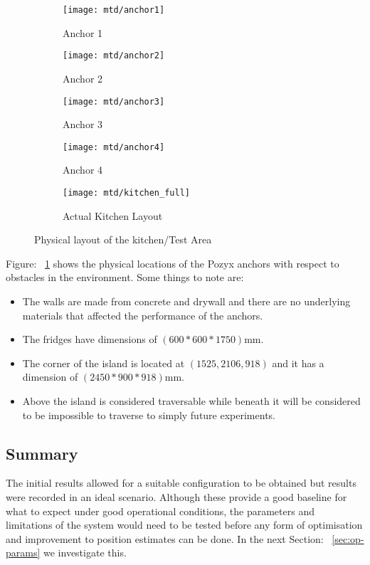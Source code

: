 \begin{figure}[h!]
    \centering
    \begin{subfigure}[b]{0.4\textwidth}
            \texttt{[image: mtd/anchor1]}
            \caption{Anchor 1}
    \end{subfigure}
    \begin{subfigure}[b]{0.4\textwidth}
            \texttt{[image: mtd/anchor2]}
            \caption{Anchor 2}
    \end{subfigure}

    \begin{subfigure}[b]{0.4\textwidth}
            \texttt{[image: mtd/anchor3]}
            \caption{Anchor 3}
    \end{subfigure}
    \begin{subfigure}[b]{0.4\textwidth}
            \texttt{[image: mtd/anchor4]}
            \caption{Anchor 4}
    \end{subfigure}

    \begin{subfigure}[b]{0.7\textwidth}
            \texttt{[image: mtd/kitchen\_full]}
            \caption{Actual Kitchen Layout}
    \end{subfigure}
    \caption{Physical layout of the kitchen/Test Area}
    \label{fig:kitchen}
\end{figure}
\medskip
Figure: ~\ref{fig:kitchen} shows the physical locations of the Pozyx anchors with respect to obstacles in the environment.
Some things to note are:
\begin{itemize}
    \item The walls are made from concrete and drywall and there are no underlying materials that affected the performance of the anchors.
    \item The fridges have dimensions of $(600*600*1750)$mm.
    \item The corner of the island is located at $(1525,2106,918)$ and it has a dimension of $(2450*900*918)$mm.
    \item Above the island is considered traversable while beneath it will be considered to be impossible to traverse to simply future experiments.
\end{itemize}

\subsection*{Summary}
The initial results allowed for a suitable configuration to be obtained but results were recorded in an ideal scenario.
Although these provide a good baseline for what to expect under good operational conditions, the parameters and limitations of the system would need to be tested before any form of optimisation
and improvement to position estimates can be done.
In the next Section: ~\ref{sec:op-params} we investigate this.

\newpage

\newpage
